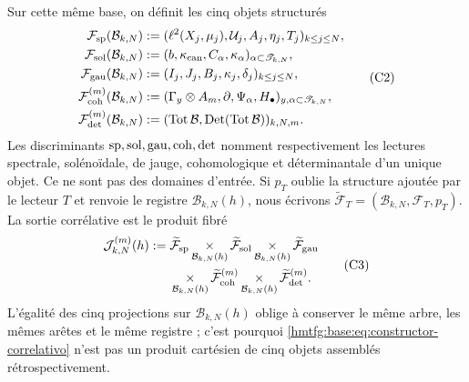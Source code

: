 Sur cette même base, on définit les cinq objets structurés
\[
\begin{aligned}
 \mathcal F_{\rm sp}(\mathcal B_{k,N})
   &:=(\ell^2(X_j,\mu_j),\mathcal U_j,A_j,\eta_j,T_j)_{k\leq j\leq N},\\
 \mathcal F_{\rm sol}(\mathcal B_{k,N})
   &:=(b,\kappa_{\rm can},C_\alpha,\kappa_\alpha)_{\alpha\subset\mathscr T_{k,N}},\\
 \mathcal F_{\rm gau}(\mathcal B_{k,N})
   &:=(I_j,J_j,B_j,\kappa_j,\delta_j)_{k\leq j\leq N},\\
 \mathcal F_{\rm coh}^{(m)}(\mathcal B_{k,N})
   &:=(\Gamma_y\otimes A_m,\partial,\Psi_\alpha,H_\bullet)_{y,\alpha\subset\mathscr T_{k,N}},\\
 \mathcal F_{\rm det}^{(m)}(\mathcal B_{k,N})
   &:=(\operatorname{Tot}\mathcal B,\operatorname{Det}(\operatorname{Tot}\mathcal B))_{k,N,m}.
\end{aligned}
 \tag{C2}
\]
Les discriminants \({\rm sp},{\rm sol},{\rm gau},{\rm coh},{\rm det}\) nomment respectivement les lectures spectrale, solénoïdale, de jauge, cohomologique et déterminantale d'un unique objet. Ce ne sont pas des domaines d'entrée. Si \(p_T\) oublie la structure ajoutée par le lecteur \(T\) et renvoie le registre \(\mathcal B_{k,N}(h)\), nous écrivons \(\widetilde{\mathcal F}_T=(\mathcal B_{k,N},\mathcal F_T,p_T)\). La sortie corrélative est le produit fibré
\[
\begin{aligned}
 \mathcal J_{k,N}^{(m)}(h):={}&
 \widetilde{\mathcal F}_{\rm sp}
 \mathop{\times}_{\mathcal B_{k,N}(h)}
 \widetilde{\mathcal F}_{\rm sol}
 \mathop{\times}_{\mathcal B_{k,N}(h)}
 \widetilde{\mathcal F}_{\rm gau}\\
 &\mathop{\times}_{\mathcal B_{k,N}(h)}
 \widetilde{\mathcal F}_{\rm coh}^{(m)}
 \mathop{\times}_{\mathcal B_{k,N}(h)}
 \widetilde{\mathcal F}_{\rm det}^{(m)}.
\end{aligned}
 \tag{C3}
 \label{hmtfg:base:eq:constructor-correlativo}
\]
L'égalité des cinq projections sur \(\mathcal B_{k,N}(h)\) oblige à
conserver le même arbre, les mêmes arêtes et le même registre ; c'est pourquoi
\eqref{hmtfg:base:eq:constructor-correlativo} n'est pas un produit cartésien de cinq
objets assemblés rétrospectivement.

